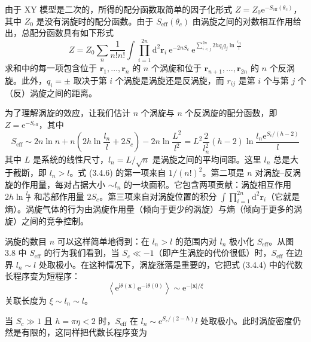 由于 XY 模型是二次的，所得的配分函数取简单的因子化形式 $Z = Z_{0}\mathrm{e}^{-S_{\mathrm{eff}}(\theta_{c})}$，其中 $Z_{0}$ 是没有涡旋时的配分函数。由于 $S_{\mathrm{eff}}(\theta_{c})$ 由涡旋之间的对数相互作用给出，总配分函数具有如下形式
\begin{equation*}
Z = Z_{0} \sum_{n} \frac{1}{n!n!} \int \prod_{i=1}^{2n} \mathrm{d}^{2}\pmb{r}_{i}\ \mathrm{e}^{-2nS_{c}}\ \mathrm{e}^{\sum_{i<j}^{2n} 2hq_{i}q_{j}\ln\frac{r_{ij}}{l}}
\tag{3.4.5}
\end{equation*}
求和中的每一项包含位于 $\pmb{r}_{1},\ldots,\pmb{r}_{n}$ 的 $n$ 个涡旋和位于 $\pmb{r}_{n+1},\ldots,\pmb{r}_{2n}$ 的 $n$ 个反涡旋。此外，$q_{i} = \pm$ 取决于第 $i$ 个涡旋是涡旋还是反涡旋，而 $r_{ij}$ 是第 $i$ 个与第 $j$ 个（反）涡旋之间的距离。

为了理解涡旋的效应，让我们估计 $n$ 个涡旋与 $n$ 个反涡旋的配分函数，即 $Z = \mathrm{e}^{-S_{\mathrm{eff}}}$，其中
\begin{equation*}
S_{\mathrm{eff}} \sim 2n\ln n + n\left(2h\ln\frac{l_{n}}{l} + 2S_{c}\right) - 2n\ln\frac{L^{2}}{l^{2}}
= L^{2}\frac{2}{l_{n}^{2}}(h-2)\ln\frac{l_{n}\mathrm{e}^{S_{c}/(h-2)}}{l}
\tag{3.4.6}
\end{equation*}
其中 $L$ 是系统的线性尺寸，$l_{n} = L/\sqrt{n}$ 是涡旋之间的平均间距。这里 $l_{n}$ 总是大于截断，即 $l_{n} > l$。式 (3.4.6) 的第一项来自 $1/(n!)^{2}$。第二项是 $n$ 对涡旋--反涡旋的作用量，每对占据大小 $\sim l_{n}$ 的一块面积。它包含两项贡献：涡旋相互作用 $2h\ln\frac{l_{n}}{l}$ 和芯部作用量 $2S_{c}$。第三项来自对涡旋位置的积分 $\int \prod_{i=1}^{2n}\mathrm{d}^{2}\pmb{r}_{i}$（它就是熵）。涡旋气体的行为由涡旋作用量（倾向于更少的涡旋）与熵（倾向于更多的涡旋）之间的竞争控制。

涡旋的数目 $n$ 可以这样简单地得到：在 $l_{n} > l$ 的范围内对 $l_{n}$ 极小化 $S_{\mathrm{eff}}$。从图 3.8 中 $S_{\mathrm{eff}}$ 的行为我们看到，当 $S_{c} \ll -1$（即产生涡旋的代价很低）时，$S_{\mathrm{eff}}$ 在边界 $l_{n} \sim l$ 处取极小。在这种情况下，涡旋涨落是重要的，它把式 (3.4.4) 中的代数长程序变为短程序：
\begin{equation*}
\left\langle \mathrm{e}^{\mathrm{i}\theta(\pmb{x})}\mathrm{e}^{-\mathrm{i}\theta(0)} \right\rangle \sim \mathrm{e}^{-|\pmb{x}|/\xi}
\end{equation*}
关联长度为 $\xi \sim l_{n} \sim l$。

当 $S_{c} \gg 1$ 且 $h = \pi\eta < 2$ 时，$S_{\mathrm{eff}}$ 在 $l_{n} \sim \mathrm{e}^{S_{c}/(2-h)}l$ 处取极小。此时涡旋密度仍然是有限的，这同样把代数长程序变为

